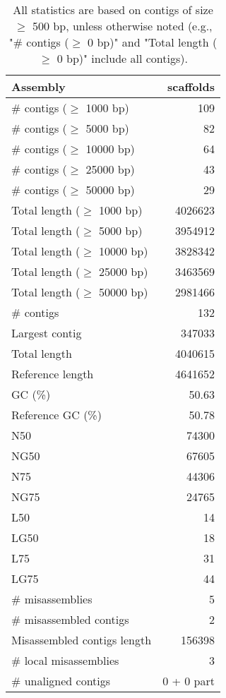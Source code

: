 \documentclass[12pt,a4paper]{article}
\begin{document}
\begin{table}[ht]
\begin{center}
\caption{All statistics are based on contigs of size $\geq$ 500 bp, unless otherwise noted (e.g., "\# contigs ($\geq$ 0 bp)" and "Total length ($\geq$ 0 bp)" include all contigs).}
\begin{tabular}{|l*{1}{|r}|}
\hline
Assembly & scaffolds \\ \hline
\# contigs ($\geq$ 1000 bp) & 109 \\ \hline
\# contigs ($\geq$ 5000 bp) & 82 \\ \hline
\# contigs ($\geq$ 10000 bp) & 64 \\ \hline
\# contigs ($\geq$ 25000 bp) & 43 \\ \hline
\# contigs ($\geq$ 50000 bp) & 29 \\ \hline
Total length ($\geq$ 1000 bp) & 4026623 \\ \hline
Total length ($\geq$ 5000 bp) & 3954912 \\ \hline
Total length ($\geq$ 10000 bp) & 3828342 \\ \hline
Total length ($\geq$ 25000 bp) & 3463569 \\ \hline
Total length ($\geq$ 50000 bp) & 2981466 \\ \hline
\# contigs & 132 \\ \hline
Largest contig & 347033 \\ \hline
Total length & 4040615 \\ \hline
Reference length & 4641652 \\ \hline
GC (\%) & 50.63 \\ \hline
Reference GC (\%) & 50.78 \\ \hline
N50 & 74300 \\ \hline
NG50 & 67605 \\ \hline
N75 & 44306 \\ \hline
NG75 & 24765 \\ \hline
L50 & 14 \\ \hline
LG50 & 18 \\ \hline
L75 & 31 \\ \hline
LG75 & 44 \\ \hline
\# misassemblies & 5 \\ \hline
\# misassembled contigs & 2 \\ \hline
Misassembled contigs length & 156398 \\ \hline
\# local misassemblies & 3 \\ \hline
\# unaligned contigs & 0 + 0 part \\ \hline

\end{tabular}
\end{center}
\end{table}
\end{document}
